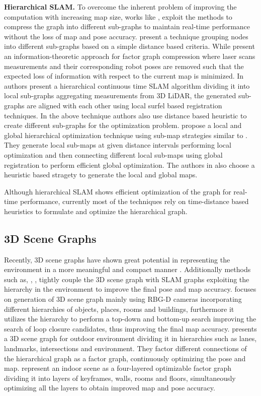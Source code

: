 \textbf{Hierarchical SLAM.} 
To overcome the inherent problem of improving the computation with increasing map size, works like \cite{hierarchical_optimization}, \cite{information_theoretic} exploit the methods to compress the graph into different sub-graphs to maintain real-time performance without the loss of map and pose accuracy.  \cite{hierarchical_optimization} present a technique grouping nodes into different sub-graphs based on a simple distance based criteria. While \cite{information_theoretic} present an information-theoretic approach for factor graph compression where laser scans measurements
and their corresponding robot poses are removed such that
the expected loss of information with respect to the current
map is minimized. In \cite{continous_time_slam} authors present a hierarchical continuous time SLAM algorithm dividing it into local sub-graphs aggregating measurements from 3D LiDAR, the generated sub-graphs are aligned with each other using local surfel based registration techniques. In the above technique authors also use distance based heuristic to create different sub-graphs for the optimization problem. \cite{globally_consistent} propose a local and global hierarchical optimization technique using sub-map strategies similar to \cite{cartographer}. They generate local sub-maps at given distance intervals performing local optimization and then connecting different local sub-maps using global registration to perform efficient global optimization. The authors in \cite{globally_consistent} also choose a heuristic based stragety to generate the local and global maps. 

Although hierarchical SLAM shows efficient optimization of the graph for real-time performance, currently most of the techniques rely on time-distance based heuristics to formulate and optimize the hierarchical graph. 


\subsection{3D Scene Graphs}
Recently, 3D scene graphs have shown great potential in representing the environment in a more meaningful and compact manner \cite{armeni, 3dssg, 3dscene_graph, scene_graph_fusion, 3ddsg}. Additionally methods such as, \cite{hydra}, \cite{curb_sg}, \cite{s_graphs+} tightly couple the 3D scene graph with SLAM graphs exploiting the hierarchy in the environment to improve the final pose and map accuracy. \cite{hydra} focuses on generation of 3D scene graph mainly using RBG-D cameras incorporating different hierarchies of objects, places, rooms and buildings, furthermore it utilizes the hierarchy to perform a top-down and bottom-up search improving the search of loop closure candidates, thus improving the final map accuracy. \cite{curb_sg} presents a 3D scene graph for outdoor environment dividing it in hierarchies such as lanes, landmarks, intersections and environment. They factor different connections of the hierarchical graph as a factor graph, continuously optimizing the pose and map. \cite{situational_graphs, s_graphs+} represent an indoor scene as a four-layered optimizable factor graph dividing it into layers of keyframes, walls, rooms and floors, simultaneously optimizing all the layers to obtain improved map and pose accuracy. 

